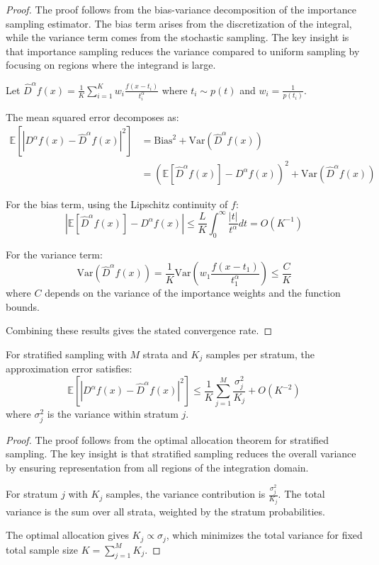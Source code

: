 \begin{proof}
The proof follows from the bias-variance decomposition of the importance sampling estimator. The bias term arises from the discretization of the integral, while the variance term comes from the stochastic sampling. The key insight is that importance sampling reduces the variance compared to uniform sampling by focusing on regions where the integrand is large.

Let $\hat{D}^{\alpha}f(x) = \frac{1}{K}\sum_{i=1}^{K} w_i \frac{f(x-t_i)}{t_i^{\alpha}}$ where $t_i \sim p(t)$ and $w_i = \frac{1}{p(t_i)}$.

The mean squared error decomposes as:
\begin{align}
\mathbb{E}[|D^{\alpha}f(x) - \hat{D}^{\alpha}f(x)|^2] &= \text{Bias}^2 + \text{Var}(\hat{D}^{\alpha}f(x)) \\
&= \left(\mathbb{E}[\hat{D}^{\alpha}f(x)] - D^{\alpha}f(x)\right)^2 + \text{Var}(\hat{D}^{\alpha}f(x))
\end{align}

For the bias term, using the Lipschitz continuity of $f$:
\begin{equation}
|\mathbb{E}[\hat{D}^{\alpha}f(x)] - D^{\alpha}f(x)| \leq \frac{L}{K} \int_0^{\infty} \frac{|t|}{t^{\alpha}} dt = O(K^{-1})
\end{equation}

For the variance term:
\begin{equation}
\text{Var}(\hat{D}^{\alpha}f(x)) = \frac{1}{K} \text{Var}\left(w_1 \frac{f(x-t_1)}{t_1^{\alpha}}\right) \leq \frac{C}{K}
\end{equation}
where $C$ depends on the variance of the importance weights and the function bounds.

Combining these results gives the stated convergence rate.
\end{proof}

\begin{theorem}
For stratified sampling with $M$ strata and $K_j$ samples per stratum, the approximation error satisfies:
\begin{equation}
\mathbb{E}[|D^{\alpha}f(x) - \hat{D}^{\alpha}f(x)|^2] \leq \frac{1}{K} \sum_{j=1}^{M} \frac{\sigma_j^2}{K_j} + O(K^{-2})
\end{equation}
where $\sigma_j^2$ is the variance within stratum $j$.
\end{theorem}

\begin{proof}
The proof follows from the optimal allocation theorem for stratified sampling. The key insight is that stratified sampling reduces the overall variance by ensuring representation from all regions of the integration domain.

For stratum $j$ with $K_j$ samples, the variance contribution is $\frac{\sigma_j^2}{K_j}$. The total variance is the sum over all strata, weighted by the stratum probabilities.

The optimal allocation gives $K_j \propto \sigma_j$, which minimizes the total variance for fixed total sample size $K = \sum_{j=1}^{M} K_j$.
\end{proof}

